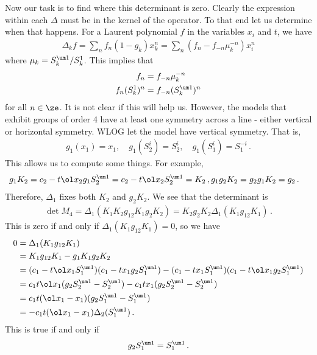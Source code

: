 Now our task is to find where this determinant is zero. Clearly the expression within each $\Delta$ must be in the kernel of the operator. To that end let us determine when that happens. For a Laurent polynomial $f$ in the variables $x_i$ and $t$, we have
\begin{align}
	\Delta_k f = \sum_n f_n (1-g_k)x_k^n = \sum_n (f_n - f_{- n}\mu_k^{- n})x_i^n
\end{align}
where $\mu_k = S_k^{\um 1}/S_k^1$. This implies that
\begin{align}
	f_{n} &= f_{- n} \mu_k^{- n}\\
	f_{n} (S_k^1)^n &= f_{- n}(S_k^{\um 1})^n
\end{align}
for all $n \in \ze$. It is not clear if this will help us. However, the models that exhibit groups of order 4 have at least one symmetry across a line - either vertical or horizontal symmetry. WLOG let the model have vertical symmetry. That is, 
\begin{align}
	g_1(x_1) = x_1, \quad g_1(S_2^i) = S_2^i,\quad g_1(S_1^i) = S_1^{-i}\,.
\end{align}
This allows us to compute some things. For example,
\begin{align}
	g_1 K_2 &= c_2 - t\ol x_2 g_1S_2^{\um 1} = c_2 - t\ol x_2 S_2^{\um 1} = K_2\,,
	g_1g_2K_2 = g_2 g_1 K_2 = g_2\,.
\end{align}
Therefore, $\Delta_1$ fixes both $K_2$ and $g_2K_2$.
We see that the determinant is
\begin{align}
	\det M_4 = \Delta_1  (K_1K_2 g_{12}K_1 g_2K_2) = K_2 g_2K_2 \Delta_1  (K_1 g_{12}K_1)\,.
\end{align}
This is zero if and only if $\Delta_1  (K_1 g_{12}K_1) = 0$, so we have
\begin{align}\begin{split}
	0&=\Delta_1  (K_1 g_{12}K_1) \\
	&= K_1g_{12}K_1 - g_1 K_1 g_2 K_2 \\
	&= (c_1-t\ol x_1S_1^{\um 1})(c_1-tx_1g_2S_1^{\um 1})-(c_1-tx_1S_1^{\um 1})(c_1-t \ol x_1 g_2S_1^{\um 1})\\
	&= c_1 t \ol x_1 (g_2 S_2^{\um 1} - S_2^{\um 1}) - c_1 t x_1 (g_2 S_2^{\um 1} - S_2^{\um 1})\\
	&= c_1 t (\ol x_1-x_1)(g_2 S_1^{\um 1}-S_1^{\um 1})\\
	& = -c_1 t(\ol x_1-x_1)\Delta_2(S_1^{\um 1})\,.
\end{split}\end{align}
This is true if and only if
\begin{align}
	g_2 S_1^{\um 1} = S_1^{\um 1}\,.
\end{align}
